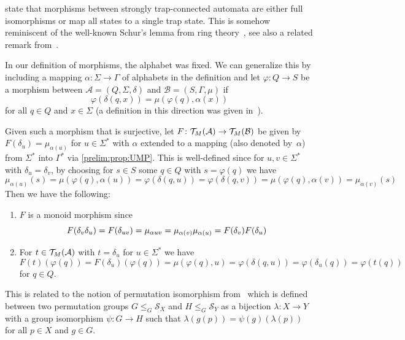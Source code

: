 state that morphisms between strongly trap-connected automata are either full isomorphisms or map all states to a single trap state.
This is somehow reminiscent of the well-known Schur's lemma from ring theory~\cite{lang02},
see also a related remark from~\cite[p.~275]{Rystsov97}.

In our definition of morphisms, the alphabet was fixed. We can generalize this
by including a mapping $\alpha \colon \Sigma \to \Gamma$ of alphabets
in the definition and let $\varphi \colon Q \to S$ be a morphism between $\mathcal A = (Q, \Sigma, \delta)$
and $\mathcal B = (S, \Gamma, \mu)$
if 
\[
\varphi(\delta(q, x)) = \mu(\varphi(q), \alpha(x))
\]
for all $q \in Q$ and $x \in \Sigma$ (a definition
in this direction was given in~\cite{Wells1976_ApplicationsWreath}).

Given such a morphism that is surjective, let $F \colon \TM{\mathcal A} \to \TM{\mathcal B}$
be given by $F(\delta_{u}) = \mu_{\alpha(u)}$
for $u \in \Sigma^*$ with $\alpha$ extended to a mapping (also denoted by~$\alpha$) 
from $\Sigma^*$ into $\Gamma^*$ via \cref{prelim:prop:UMP}.
This is well-defined since for $u,v \in \Sigma^*$
with $\delta_u = \delta_v$,
by choosing for $s \in S$ some $q \in Q$ with $s = \varphi(q)$
we have 
\[
\mu_{\alpha(u)}(s) = \mu(\varphi(q), \alpha(u)) = \varphi(\delta(q, u)) = \varphi(\delta(q, v)) = \mu(\varphi(q), \alpha(v)) = \mu_{\alpha(v)}(s)
\]
Then we have the following:
\begin{enumerate}
\item $F$ is a monoid morphism since
\[
F(\concat{\delta_u}{\delta_v}) = F(\delta_{uv}) = \mu_{\alpha{uv}} = \concat{\mu_{\alpha(u)}}{\mu_{\alpha(v)}} = \concat{F(\delta_u)}{F(\delta_v)}
\]

\item For $t \in \TM{\mathcal A}$
with $t = \delta_u$ for $u \in \Sigma^*$ we have
\[
F(t)(\varphi(q))
= F(\delta_u)(\varphi(q))
= \mu(\varphi(q), u) = \varphi(\delta(q, u)) = \varphi(\delta_u(q))
= \varphi(t(q))
\]
for $q \in Q$.
\end{enumerate}
This is related to the notion of permutation isomorphism
from~\cite[p.~17]{dixon1996permutation}
which is defined between two permutation groups $G \le_G \mathcal S_X$
and $H \le_G \mathcal S_Y$ as a bijection $\lambda \colon X \to Y$
with a group isomorphism $\psi \colon G \to H$
such that $\lambda(g(p)) = \psi(g)(\lambda(p))$
for all $p \in X$ and $g \in G$.



